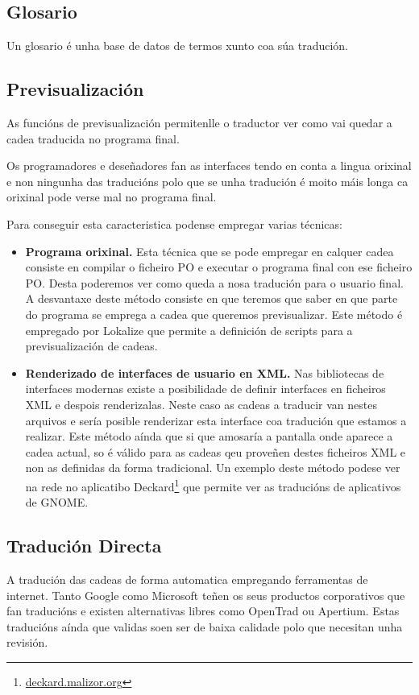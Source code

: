 \subsection{Glosario}
Un glosario é unha base de datos de termos xunto coa súa tradución.


\subsection{Previsualización}
As funcións de previsualización permitenlle o traductor ver como vai quedar a cadea traducida no programa final. 

Os programadores e deseñadores fan as interfaces tendo en conta a lingua orixinal e non ningunha das traducións polo que se unha tradución é moito máis longa ca orixinal pode verse mal no programa final.

Para conseguir esta caracteristica podense empregar varias técnicas:

\begin{itemize}
  \item \textbf{Programa orixinal.} Esta técnica que se pode empregar en calquer cadea consiste en compilar o ficheiro PO e executar o programa final con ese ficheiro PO. Desta poderemos ver como queda a nosa tradución para o usuario final. A desvantaxe deste método consiste en que teremos que saber en que parte do programa se emprega a cadea que queremos previsualizar. Este método é empregado por Lokalize que permite a definición de scripts para a previsualización de cadeas.

  \item \textbf{Renderizado de interfaces de usuario en XML.} Nas bibliotecas de interfaces modernas existe a posibilidade de definir interfaces en ficheiros XML e despois renderizalas. Neste caso as cadeas a traducir van nestes arquivos e sería posible renderizar esta interface coa tradución que estamos a realizar. Este método aínda que si que amosaría a pantalla onde aparece a cadea actual, so é válido para as cadeas qeu proveñen destes ficheiros XML e non as definidas da forma tradicional. Un exemplo deste método podese ver na rede no aplicatibo Deckard\footnote{\href{http://deckard.malizor.org/}{deckard.malizor.org}} que permite ver as traducións de aplicativos de GNOME.
\end{itemize}


\subsection{Tradución Directa}
A tradución das cadeas de forma automatica empregando ferramentas de internet. Tanto Google como Microsoft teñen os seus productos corporativos que fan traducións e existen alternativas libres como OpenTrad ou Apertium. Estas traducións aínda que validas soen ser de baixa calidade polo que necesitan unha revisión.
